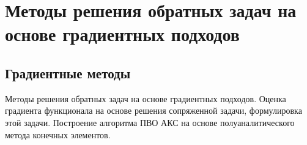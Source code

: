 \chapter{Методы решения обратных задач на основе градиентных подходов}\label{ch:ch_my_4}

\section{Градиентные методы}\label{sec:ch_my_4/sec1}

Методы решения обратных задач на основе градиентных подходов. Оценка градиента функционала на основе решения сопряженной задачи, формулировка этой задачи. Построение алгоритма ПВО АКС на основе полуаналитического метода конечных элементов.


